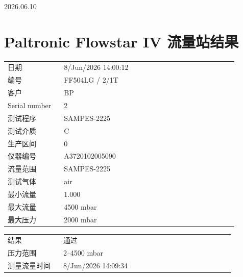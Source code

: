\documentclass[UTF8,10pt,a4paper,fontset=fandol]{ctexart}
\newcommand{\fieldvalue}[1]{#1}
\newcommand{\handwritten}[1]{#1}
\begin{document}
\handwritten{2026.06.10}

\newpage

\section{Paltronic Flowstar IV 流量站结果}

\begin{tabular}{@{}p{0.22\linewidth}p{0.68\linewidth}@{}}
日期 &
\fieldvalue{8/Jun/2026 14:00:12}
\\
编号 &
\fieldvalue{FF504LG / 2/1T}
\\
客户 &
\fieldvalue{BP}
\\
Serial number &
\fieldvalue{2}
\\
测试程序 &
\fieldvalue{SAMPES-2225}
\\
测试介质 &
\fieldvalue{C}
\\
生产区间 &
\fieldvalue{0}
\\
仪器编号 &
\fieldvalue{A3720102005090}
\\
流量范围 &
\fieldvalue{SAMPES-2225}
\\
测试气体 &
\fieldvalue{air}
\\
最小流量 &
\fieldvalue{1.000}
\\
最大流量 &
\fieldvalue{4500 mbar}
\\
最大压力 &
\fieldvalue{2000 mbar}
\\
\end{tabular}

\vspace{1em}

\begin{tabular}{@{}p{0.22\linewidth}p{0.68\linewidth}@{}}
结果 &
\fieldvalue{通过}
\\
压力范围 &
\fieldvalue{2--4500 mbar}
\\
测量流量时间 &
\fieldvalue{8/Jun/2026 14:09:34}
\\
\end{tabular}
\end{document}
